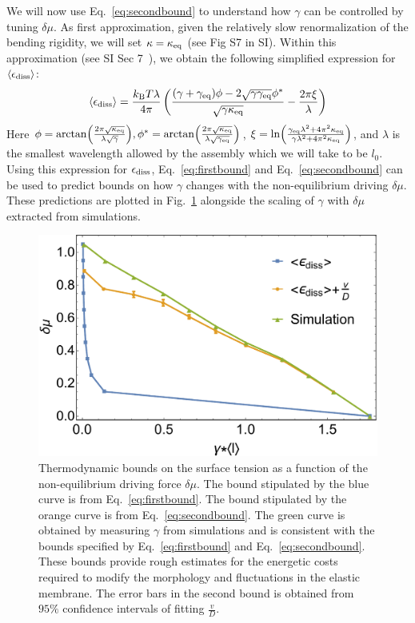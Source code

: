 \documentclass[amsmath,preprintnumbers,10pt,nofootinbib,prl,twocolumn]{revtex4-1}
\begin{document}
We will now use Eq.~\ref{eq:secondbound} to understand how $\gamma$ can be controlled by tuning $\delta \mu$. As first approximation, given the relatively slow renormalization of the bending rigidity, we will set $\kappa=\kappa_{\rm eq}$ (see Fig S7 in SI). Within this approximation (see SI Sec 7~\cite{Supplementary}), we obtain the following simplified expression for $\langle \epsilon_{\rm diss} \rangle$: 
\begin{equation}
\label{eq:epsilonexpress}
 \langle\epsilon_{\rm diss}\rangle =\frac{k_{\rm B}T\lambda}{4\pi}\left ( \frac{(\gamma + \gamma_{\rm eq})\phi-2\sqrt{\gamma\gamma_{\rm eq}}\phi^*}{\sqrt{\gamma \kappa_{\rm eq}}}-\frac{2\pi \xi}{\lambda} \right)
\end{equation}
Here $\phi=\arctan(\frac{2\pi\sqrt{\kappa_{\rm eq}}}{\lambda\sqrt{\gamma}}), \phi^*=\arctan(\frac{2\pi\sqrt{\kappa_{\rm eq}}}{\lambda\sqrt{\gamma_{\rm{eq}}}})$, $\xi=\ln(\frac{\gamma_{\rm{eq}}\lambda^2+4\pi^2\kappa_{\rm eq}}{\gamma\lambda^2+4\pi^2\kappa_{\rm eq}})$, and $\lambda$ is the smallest wavelength allowed by the assembly which we will take to be $l_0$. Using this expression for $\epsilon_{\rm diss}$, Eq.~\ref{eq:firstbound} and Eq.~\ref{eq:secondbound} can be used to predict bounds on how $\gamma$ changes with the non-equilibrium driving $\delta \mu$. These predictions are plotted in Fig.~\ref{fig:PhaseDiagram} alongside the scaling of $\gamma$ with $\delta \mu$ extracted from simulations. 

\begin{figure}[tbb]
\centering
\includegraphics[scale=0.38]{Fig6.pdf}
\caption{Thermodynamic bounds on the surface tension as a function of the non-equilibrium driving force $\delta\mu$. The bound stipulated by the blue curve is from Eq.~\ref{eq:firstbound}. The bound stipulated by the orange curve is from Eq.~\ref{eq:secondbound}. The green curve is obtained by measuring $\gamma$ from simulations and is consistent with the bounds specified by Eq.~\ref{eq:firstbound} and Eq.~\ref{eq:secondbound}. These bounds provide rough estimates for the energetic costs required to modify the morphology and fluctuations in the elastic membrane. The error bars in the second bound is obtained from $95\%$ confidence intervals of fitting $\frac{v}{D}$.}\label{fig:PhaseDiagram}
\end{figure}
\end{document}
